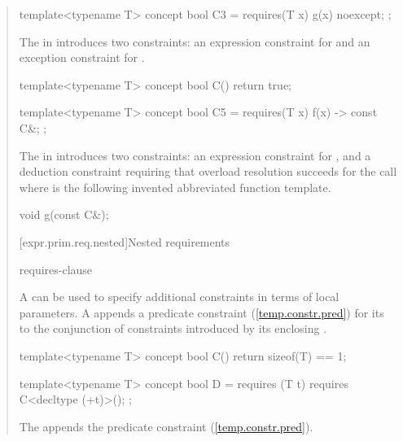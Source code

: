 \begin{quote}
\begin{codeblock}
template<typename T> concept bool C3 =
  requires(T x) {
    {g(x)} noexcept;
  };
\end{codeblock}

The  in  
introduces two constraints: an expression constraint for  
and an exception constraint for .

\begin{codeblock}
template<typename T> concept bool C() { return true; }

template<typename T> concept bool C5 =
  requires(T x) {
    {f(x)} -> const C&;
  };
\end{codeblock}

The  in  
introduces two constraints: an expression constraint for , 
and a deduction constraint requiring that overload resolution succeeds for the
call  where  is the following
invented abbreviated function template.
\begin{codeblock}
void g(const C&);
\end{codeblock}
\exitexample

[expr.prim.req.nested]{Nested requirements}

\begin{bnf}
\br
    requires-clause \terminal{;}
  \end{bnf}

\pnum
A  can be used
to specify additional constraints in terms of local parameters.
%
A  appends a predicate constraint 
(\ref{temp.constr.pred}) for its  
to the conjunction of constraints introduced by its enclosing
.
% 
\enterexample
\begin{codeblock}
template<typename T> concept bool C() { return sizeof(T) == 1; }

template<typename T> concept bool D =
  requires (T t) {
    requires C<decltype (+t)>();
  };
\end{codeblock}
The  appends the predicate constraint 
 (\ref{temp.constr.pred}).
\exitexample

\end{quote}
